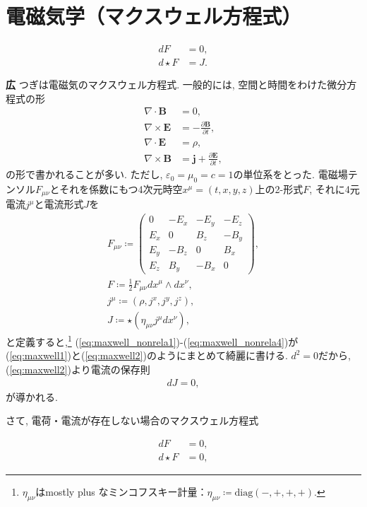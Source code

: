 \documentclass{ltjsarticle}
\theoremstyle{definition}
\newcommand{\parno}{\par\noindent}
\begin{document}
\section{電磁気学（マクスウェル方程式）\label{section:maxwell}}
\begin{tcolorbox}
  \begin{align}
    dF&=0\label{eq:maxwell1},\\
    d\star F&=J.\label{eq:maxwell2}
  \end{align}
\end{tcolorbox}
\parno
\textbf{広} つぎは電磁気のマクスウェル方程式. 一般的には, 空間と時間をわけた微分方程式の形
\begin{align}
  \nabla\cdot\boldsymbol B&=0\label{eq:maxwell_nonrela1},\\
  \nabla\times\boldsymbol E&=-\frac{\partial\boldsymbol B}{\partial t},\\
  \nabla\cdot\boldsymbol E&=\rho,\\
  \nabla\times\boldsymbol B&=\boldsymbol j+\frac{\partial\boldsymbol E}{\partial t},\label{eq:maxwell_nonrela4}
\end{align}
の形で書かれることが多い. ただし, $\varepsilon_0=\mu_0=c=1$の単位系をとった. 電磁場テンソル$F_{\mu\nu}$とそれを係数にもつ4次元時空$x^\mu=(t,x,y,z)$上の2-形式$F$, それに4元電流$j^\mu$と電流形式$J$を
\begin{gather}
F_{\mu\nu}\coloneqq
  \begin{pmatrix}
    0&-E_x&-E_y&-E_z\\
    E_x&0&B_z&-B_y\\
    E_y&-B_z&0&B_x\\
    E_z&B_y&-B_x&0
  \end{pmatrix},\\
  F\coloneqq\frac12F_{\mu\nu}dx^\mu\wedge dx^\nu,\\
  j^\mu\coloneqq(\rho,j^x,j^y,j^z),\\
  J\coloneqq\star(\eta_{\mu\nu}j^\mu dx^\nu),
\end{gather}
と定義すると,\footnote{$\eta_{\mu\nu}$はmostly plus なミンコフスキー計量：$\eta_{\mu\nu}\coloneqq\text{diag}(-,+,+,+)$.} (\ref{eq:maxwell_nonrela1})-(\ref{eq:maxwell_nonrela4})が(\ref{eq:maxwell1})と(\ref{eq:maxwell2})のようにまとめて綺麗に書ける. $d^2=0$だから, (\ref{eq:maxwell2})より電流の保存則
\begin{align}
  dJ=0,
\end{align}
が導かれる.\par
さて, 電荷・電流が存在しない場合のマクスウェル方程式
\begin{tcolorbox}
  \begin{align}
    dF&=0,\label{eq:maxwell_vacuum1}\\
    d\star F&=0,\label{eq:maxwell_vacuum2}
  \end{align}
\end{tcolorbox}
\end{document}
